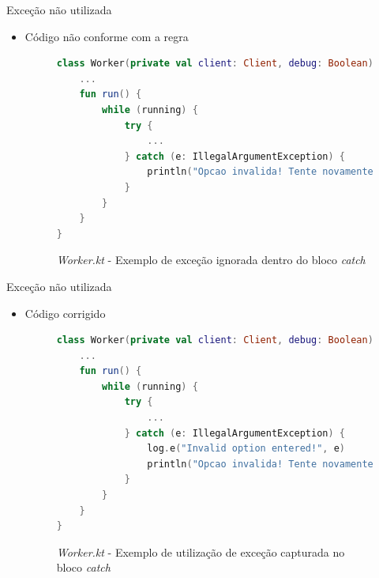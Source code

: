 \documentclass[brazilian]{beamer}
\begin{document}
\begin{frame}[fragile]{Exceção não utilizada}
    \begin{itemize}
        \item Código não conforme com a regra
        \begin{figure}[H]
            \centering
            \begin{lstlisting}[language=Kotlin]
class Worker(private val client: Client, debug: Boolean) {
    ...
    fun run() {
        while (running) {
            try {
                ...
            } catch (e: IllegalArgumentException) {
                println("Opcao invalida! Tente novamente ou pressione Ctrl+D para finalizar.")
            }
        }
    }
}
            \end{lstlisting}
            \caption{\textit{Worker.kt} - Exemplo de exceção ignorada dentro do bloco \textit{catch}}
            \label{fig:detekt_swallowed_exception_before_example}
        \end{figure}
    \end{itemize}
\end{frame}

\begin{frame}[fragile]{Exceção não utilizada}
    \begin{itemize}
        \item Código corrigido
        \begin{figure}[H]
            \centering
            \begin{lstlisting}[language=Kotlin]
class Worker(private val client: Client, debug: Boolean) {
    ...
    fun run() {
        while (running) {
            try {
                ...
            } catch (e: IllegalArgumentException) {
                log.e("Invalid option entered!", e)
                println("Opcao invalida! Tente novamente ou pressione Ctrl+D para finalizar.")
            }
        }
    }
}
            \end{lstlisting}
            \caption{\textit{Worker.kt} - Exemplo de utilização de exceção capturada no bloco \textit{catch}}
            \label{fig:detekt_swallowed_exception_after_example}
        \end{figure}
    \end{itemize}
\end{frame}
\end{document}
